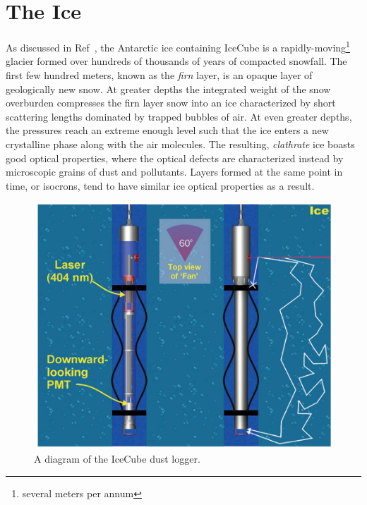 \documentclass[main.tex]{subfiles}
\begin{document}

\section{The Ice}
As discussed in Ref~\cite{journal_glaciology_2013}, the Antarctic ice containing IceCube is a rapidly-moving\footnote{several meters per annum} glacier formed over hundreds of thousands of years of compacted snowfall. 
The first few hundred meters, known as the \textit{firn} layer, is an opaque layer of geologically new snow. 
At greater depths the integrated weight of the snow overburden compresses the firn layer snow into an ice characterized by short scattering lengths dominated by trapped bubbles of air.
At even greater depths, the pressures reach an extreme enough level such that the ice enters a new crystalline phase along with the air molecules. 
The resulting, \textit{clathrate} ice boasts good optical properties, where the optical defects are characterized instead by microscopic grains of dust and pollutants. 
Layers formed at the same point in time, or isocrons, tend to have similar ice optical properties as a result. 

\begin{figure}
    \centering
    \includegraphics[width=0.6\linewidth]{figures/dustlog.png}
    \caption{A diagram of the IceCube dust logger.}\label{fig:dustlog}
\end{figure}
\end{document}
